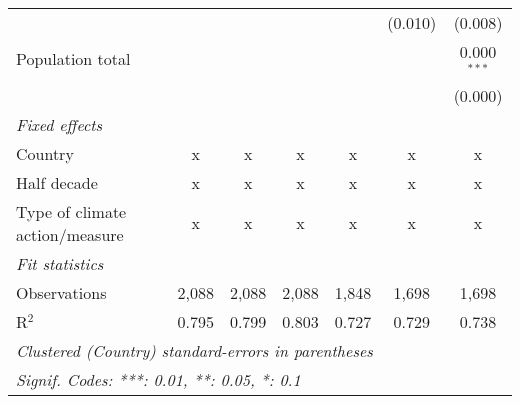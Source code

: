 \begin{tabular}{lcccccc}
                                                                              &         &                &                &                & (0.010)        & (0.008)\\   
   Population total                                                           &         &                &                &                &                & 0.000$^{***}$\\   
                                                                              &         &                &                &                &                & (0.000)\\   
   \emph{Fixed effects}\\
   Country                                                                    & x       & x              & x              & x              & x              & x\\  
   Half decade                                                                & x       & x              & x              & x              & x              & x\\  
   Type of climate action/measure                                             & x       & x              & x              & x              & x              & x\\  
   \midrule \emph{Fit statistics}\\
   Observations                                                               & 2,088   & 2,088          & 2,088          & 1,848          & 1,698          & 1,698\\  
   R$^2$                                                                      & 0.795   & 0.799          & 0.803          & 0.727          & 0.729          & 0.738\\  
   \midrule
   \multicolumn{7}{l}{\emph{Clustered (Country) standard-errors in parentheses}}\\
   \multicolumn{7}{l}{\emph{Signif. Codes: ***: 0.01, **: 0.05, *: 0.1}}\\
\end{tabular}
\par\endgroup


